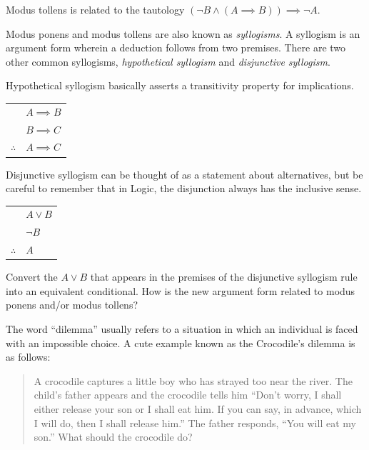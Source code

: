 Modus tollens is related to the tautology $({\lnot}B \land (A \implies B)) \implies {\lnot}A$.

Modus ponens and modus tollens are also known as 
\emph{syllogisms}.  A 
syllogism is an argument form wherein a deduction follows from two premises.
There are two other common syllogisms, 
\emph{hypothetical syllogism} and
\emph{disjunctive syllogism}.

Hypothetical syllogism basically asserts a transitivity property for 
implications.

\begin{center}
\begin{tabular}{cl}
 & $A \implies B$ \\
 & $B \implies C$ \\ \hline
$\therefore$ & $A \implies C$ \\
\end{tabular}
\end{center}

Disjunctive syllogism can be thought of as a statement about
alternatives, but be careful to remember that in Logic, the disjunction
always has the inclusive sense.

\begin{center}
\begin{tabular}{cl}
 & $A \lor B$ \\
 & ${\lnot}B$ \\ \hline
$\therefore$ & $A$ \\
\end{tabular}
\end{center}

\begin{exer}
Convert the $A \lor B$ that appears in the premises of the disjunctive
syllogism rule into an equivalent conditional.  How is the new argument
form related to modus ponens and/or modus tollens?
\end{exer}
 
The word ``dilemma'' usually refers to a situation in which an individual
is faced with an impossible choice.  A cute example known as the 
Crocodile's dilemma is as follows:

\begin{quote}
A crocodile captures a little boy who has strayed too near the river.  The 
child's father appears and the crocodile tells him ``Don't worry, I shall 
either release your son or I shall eat him.  If you can say, in advance,
which I will do, then I shall release him.''  The father responds, ``You will
eat my son.''  What should the crocodile do?
\end{quote} 

